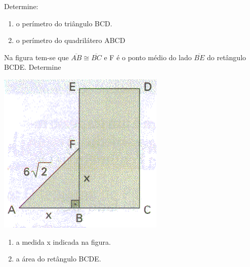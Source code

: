 Determine:
	\begin{enumerate}
	\item o perímetro do triângulo BCD.
	\item o perímetro do quadrilátero ABCD
	\end{enumerate}
	\item Na figura tem-se que $\overline{AB} \cong \overline{BC}$ e F é o ponto médio do lado $\overline{BE}$ do retângulo BCDE. 
	Determine 
\begin{center}
		\includegraphics[scale=0.5]{figuras/fig79.png}	

	\end{center}	\begin{enumerate}
	\item a medida x indicada na figura.
	\item a área do retângulo BCDE.		
	\end{enumerate}
	
